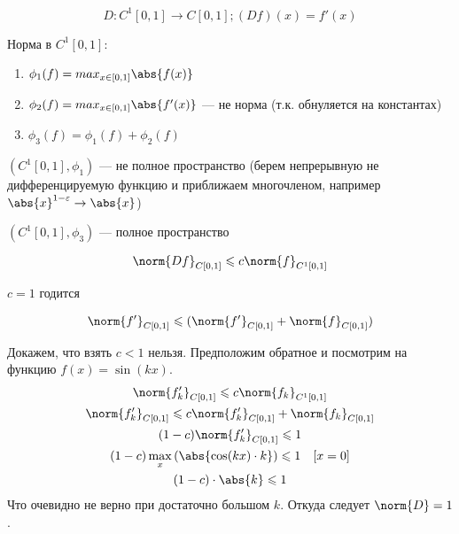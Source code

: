 \begin{example}
    \[
        D: C^1[0, 1] \to C[0, 1]; (Df)(x) = f'(x)
    \]

    Норма в $C^1[0, 1]$:

    \begin{enumerate}
        \item $
            \phi_1(f) = max_{x \in [0, 1]} \abs{f(x)}  
        $ 
        \item $
            \phi_2(f) = max_{x \in [0, 1]} \abs{f'(x)}  
        $ --- не норма (т.к. обнуляется на константах)
        \item $
            \phi_3(f) = \phi_1(f) + \phi_2(f)
        $
    \end{enumerate}

    $(C^1[0, 1], \phi_1)$ --- не полное пространство (берем непрерывную не дифференцируемую функцию и приближаем многочленом, например $\abs{x} ^ {1 - \varepsilon} \to \abs{x} $)

    \exercise  $(C^1[0, 1], \phi_3)$ --- полное пространство


    \[
        \norm{Df}_{C[0, 1]} \leqslant c \norm{f}_{C^1 [0,1]}
    \]

    $c = 1$ годится

    \[
        \norm{f'}_{C[0, 1]} \leqslant (\norm{f'}_{C[0,1]} + \norm{f}_{C[0, 1]})
    \]

    Докажем, что взять $c < 1$ нельзя. Предположим обратное и посмотрим
    на функцию $f(x) = \sin(kx)$.
    \[
        \begin{gathered}
            \norm{f'_k}_{C[0, 1]} \leqslant c \norm{f_k}_{C^1 [0,1]}\\
            \norm{f'_k}_{C[0, 1]} \leqslant c \norm{f_k'}_{C[0,1]} + \norm{f_k}_{C[0,1]}\\
            (1 - c) \norm{f'_k}_{C[0,1]}  \leqslant 1 \\
            (1-c) \max_x\left(\abs{\cos(kx) \cdot k}\right) \leqslant 1 \quad [x = 0]\\
            (1-c) \cdot \abs{k} \leqslant 1
        \end{gathered}
    \]
    Что очевидно не верно при достаточно большом $k$. Откуда следует $\norm{D} = 1$.
\end{example}

